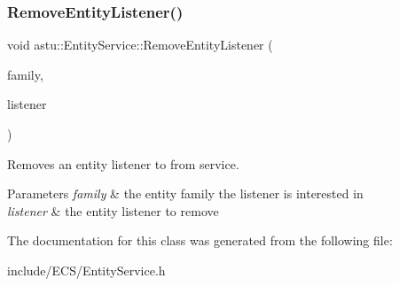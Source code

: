 \subsubsection{\texorpdfstring{Remove\+Entity\+Listener()}{RemoveEntityListener()}}
{\footnotesize\ttfamily void astu\+::\+Entity\+Service\+::\+Remove\+Entity\+Listener (\begin{DoxyParamCaption}\item[{const \hyperlink{classastu_1_1EntityFamily}{Entity\+Family} \&}]{family,  }\item[{\hyperlink{classastu_1_1IEntityListener}{I\+Entity\+Listener} \&}]{listener }\end{DoxyParamCaption})}

Removes an entity listener to from service.


\begin{DoxyParams}{Parameters}
{\em family} & the entity family the listener is interested in \\
\hline
{\em listener} & the entity listener to remove \\
\hline
\end{DoxyParams}


The documentation for this class was generated from the following file\+:\begin{DoxyCompactItemize}
\item 
include/\+E\+C\+S/Entity\+Service.\+h\end{DoxyCompactItemize}
